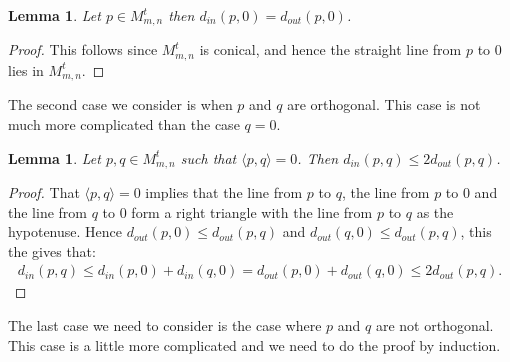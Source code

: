 \documentclass[a4paper,oneside]{amsart}
\newtheorem{lemma}[thm]{Lemma}
\theoremstyle{definition}
\begin{document}
\begin{lemma}\label{0case}
Let $p\in{M^{ {t} }_{m,n}}$ then $d_{in}(p,0)=d_{out}(p,0)$.
\end{lemma}

\begin{proof}
This follows since ${M^{ {t} }_{m,n}}$ is conical, and hence the straight line
from $p$ to $0$ lies in ${M^{ {t} }_{m,n}}$.
\end{proof}

The second case we consider is when $p$ and $q$ are orthogonal. This
case is not much more complicated than the case $q=0$.

\begin{lemma}\label{orthogonalcase}
Let $p,q\in{M^{ {t} }_{m,n}}$ such that $\langle p,q\rangle = 0$. Then
$d_{in}(p,q) \leq 2d_{out}(p,q)$.
\end{lemma}

\begin{proof}
That $\langle p,q \rangle = 0$ implies
that the line from $p$ to $q$, the line from $p$ to $0$ and the line
from $q$ to $0$ form a right triangle with the line from $p$ to
$q$ as the hypotenuse. Hence $d_{out}(p,0)\leq d_{out}(p,q)$ and
$d_{out}(q,0)\leq d_{out}(p,q)$, this the gives that:
\begin{align*}
d_{in}(p,q)\leq d_{in}(p,0)+ d_{in}(q,0) = d_{out}(p,0)+ d_{out}(q,0)
\leq 2 d_{out}(p,q).
\end{align*}
 
\end{proof}

The last case we need to consider is the case where $p$ and $q$ are
not orthogonal. This case is a little more complicated and we need to
do the proof by induction. 
\end{document}
